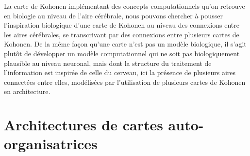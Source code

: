 \documentclass[../main]{subfiles}
\begin{document}



La carte de Kohonen implémentant des concepts computationnels qu'on retrouve en biologie au niveau de l'aire cérébrale, nous pouvons chercher à pousser l'inspiration biologique d'une carte de Kohonen au niveau des connexions entre les aires cérébrales, se transcrivant par des connexions entre plusieurs cartes de Kohonen.
De la même façon qu'une carte n'est pas un modèle biologique, il s'agit plutôt de développer un modèle computationnel qui ne soit pas biologiquement plausible au niveau neuronal, mais dont la structure du traitement de l'information est inspirée de celle du cerveau, ici la présence de plusieurs aires connectées entre elles, modélisées par l'utilisation de plusieurs cartes de Kohonen en architecture.

\section{Architectures de cartes auto-organisatrices}
\end{document}
